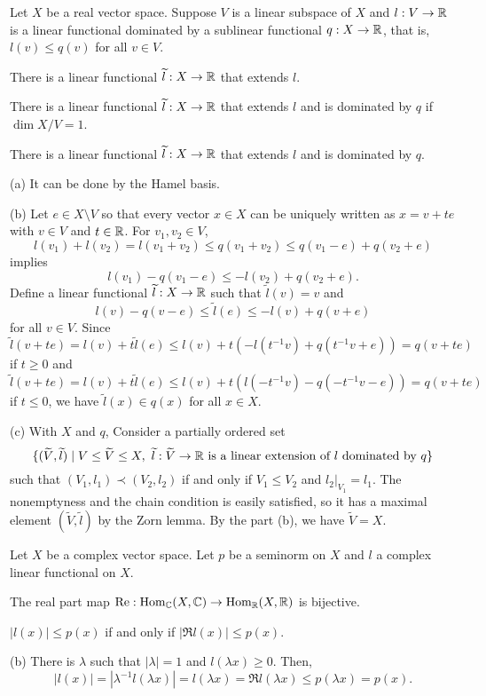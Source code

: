\documentclass{../../large}
\begin{document}
\begin{prb}
Let $X$ be a real vector space.
Suppose $V$ is a linear subspace of $X$ and $l:V\to\mathbb{R}$ is a linear functional dominated by a sublinear functional $q:X\to\mathbb{R}$, that is, $l(v)\le q(v)$ for all $v\in V$.
\begin{parts}
\item There is a linear functional $\widetilde l:X\to\mathbb{R}$ that extends $l$.
\item There is a linear functional $\widetilde l:X\to\mathbb{R}$ that extends $l$ and is dominated by $q$ if $\dim X/V=1$.
\item There is a linear functional $\widetilde l:X\to\mathbb{R}$ that extends $l$ and is dominated by $q$.
\end{parts}
\end{prb}
\begin{pf}
(a)
It can be done by the Hamel basis.

(b)
Let $e\in X\setminus V$ so that every vector $x\in X$ can be uniquely written as $x=v+te$ with $v\in V$ and $t\in\mathbb{R}$.
For $v_1,v_2\in V$,
\[l(v_1)+l(v_2)=l(v_1+v_2)\le q(v_1+v_2)\le q(v_1-e)+q(v_2+e)\]
implies
\[l(v_1)-q(v_1-e)\le-l(v_2)+q(v_2+e).\]
Define a linear functional $\widetilde l:X\to\mathbb{R}$ such that $\tilde l(v)=v$ and
\[l(v)-q(v-e)\le\tilde l(e)\le-l(v)+q(v+e)\]
for all $v\in V$.
Since
\[\tilde l(v+te)=l(v)+t\tilde l(e)\le l(v)+t(-l(t^{-1}v)+q(t^{-1}v+e))=q(v+te)\]
if $t\ge0$ and
\[\tilde l(v+te)=l(v)+t\tilde l(e)\le l(v)+t(l(-t^{-1}v)-q(-t^{-1}v-e))=q(v+te)\]
if $t\le0$, we have $\tilde l(x)\in q(x)$ for all $x\in X$.

(c)
With $X$ and $q$, Consider a partially ordered set
\[\{(\widetilde V,\widetilde l)\mid
V\le\widetilde V\le X,\ \widetilde l:\widetilde V\to\mathbb{R}\text{ is a linear extension of $l$ dominated by $q$}\}\]
such that $(V_1,l_1)\prec(V_2,l_2)$ if and only if $V_1\le V_2$ and $l_2|_{V_1}=l_1$.
The nonemptyness and the chain condition is easily satisfied, so it has a maximal element $(\tilde V,\tilde l)$ by the Zorn lemma.
By the part (b), we have $\tilde V=X$.
\end{pf}

\begin{prb}
Let $X$ be a complex vector space.
Let $p$ be a seminorm on $X$ and $l$ a complex linear functional on $X$.
\begin{parts}
\item The real part map $\operatorname{Re}:\operatorname{Hom}_{\mathbb{C}}(X,\mathbb{C})\to\operatorname{Hom}_{\mathbb{R}}(X,\mathbb{R})$ is bijective.
\item $|l(x)|\le p(x)$ if and only if $|\Re l(x)|\le p(x)$.
\end{parts}
\end{prb}
\begin{pf}
(b)
There is $\lambda$ such that $|\lambda|=1$ and $l(\lambda x)\ge0$.
Then,
\[|l(x)|=|\lambda^{-1}l(\lambda x)|=l(\lambda x)=\Re l(\lambda x)\le p(\lambda x)=p(x).\]
\end{pf}
\end{document}
